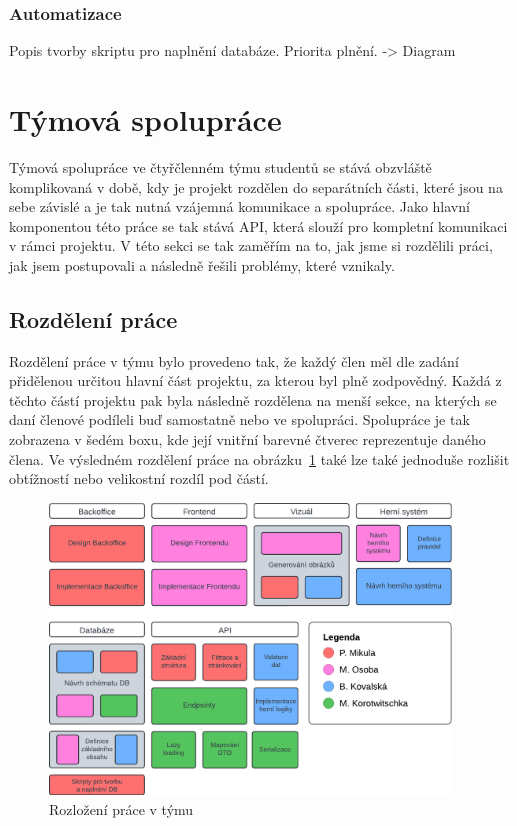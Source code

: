 \subsubsection*{Automatizace}
\label{subsubsec:implementation-technologies-database-automatization}
Popis tvorby skriptu pro naplnění databáze. Priorita plnění. -> Diagram

\section{Týmová spolupráce}
\label{sec:implementation-collaboration}
Týmová spolupráce ve čtyřčlenném týmu studentů se stává obzvláště komplikovaná v době, kdy je projekt rozdělen do separátních části, které jsou na sebe závislé a je tak nutná vzájemná komunikace a spolupráce. Jako hlavní komponentou této práce se tak stává API, která slouží pro kompletní komunikaci v rámci projektu. V této sekci se tak zaměřím na to, jak jsme si rozdělili práci, jak jsem postupovali a následně řešili problémy, které vznikaly.

\subsection{Rozdělení práce}
\label{subsec:implementation-collaboration-distribution}
Rozdělení práce v týmu bylo provedeno tak, že každý člen měl dle zadání přidělenou určitou hlavní část projektu, za kterou byl plně zodpovědný. Každá z těchto částí projektu pak byla následně rozdělena na menší sekce, na kterých se daní členové podíleli buď samostatně nebo ve spolupráci. Spolupráce je tak zobrazena v šedém boxu, kde její vnitřní barevné čtverec reprezentuje daného člena. Ve výsledném rozdělení práce na obrázku~\ref{fig:job_distribution} také lze také jednoduše rozlišit obtížností nebo velikostní rozdíl pod částí.

\begin{figure}[h]
    \centering
    \includegraphics[width=0.95\textwidth]{../../shared/diagrams/blocks}
    \caption{Rozložení práce v týmu}
    \label{fig:job_distribution}
\end{figure}

